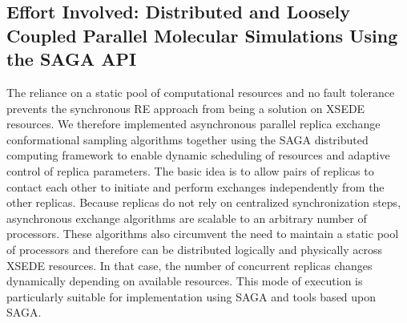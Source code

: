 \documentclass{sig-alternate}
\begin{document}
% 
% 
% 
% 
% 

\subsection{Effort Involved: Distributed and Loosely Coupled Parallel Molecular Simulations
Using the SAGA API}

The reliance on a static pool of computational resources and no
fault tolerance prevents the synchronous RE approach from being a
solution on XSEDE resources. We therefore implemented asynchronous
parallel replica exchange conformational sampling algorithms together
using the SAGA distributed computing framework to enable dynamic
scheduling of resources and adaptive control of replica
parameters. The basic idea is to allow pairs of replicas to contact
each other to initiate and perform exchanges independently from the
other replicas. Because replicas do not rely on centralized
synchronization steps, asynchronous exchange algorithms are scalable to an
arbitrary number of processors. These algorithms also circumvent
the need to maintain a static pool of processors and therefore
can be distributed logically and physically across XSEDE resources.
In that case, the number of concurrent replicas changes dynamically
depending on available resources. This mode of execution is particularly
suitable for implementation using SAGA and tools based upon SAGA.
\end{document}
